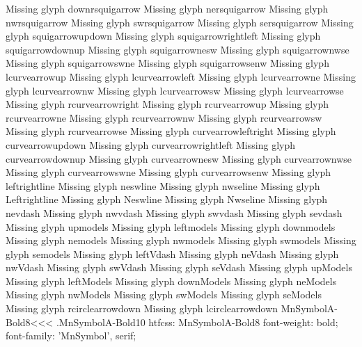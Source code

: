 Missing glyph	downrsquigarrow
Missing glyph	nersquigarrow
Missing glyph	nwrsquigarrow
Missing glyph	swrsquigarrow
Missing glyph	sersquigarrow
Missing glyph	squigarrowupdown
Missing glyph	squigarrowrightleft
Missing glyph	squigarrowdownup
Missing glyph	squigarrownesw
Missing glyph	squigarrownwse
Missing glyph	squigarrowswne
Missing glyph	squigarrowsenw
Missing glyph	lcurvearrowup
Missing glyph	lcurvearrowleft
Missing glyph	lcurvearrowne
Missing glyph	lcurvearrownw
Missing glyph	lcurvearrowsw
Missing glyph	lcurvearrowse
Missing glyph	rcurvearrowright
Missing glyph	rcurvearrowup
Missing glyph	rcurvearrowne
Missing glyph	rcurvearrownw
Missing glyph	rcurvearrowsw
Missing glyph	rcurvearrowse
Missing glyph	curvearrowleftright
Missing glyph	curvearrowupdown
Missing glyph	curvearrowrightleft
Missing glyph	curvearrowdownup
Missing glyph	curvearrownesw
Missing glyph	curvearrownwse
Missing glyph	curvearrowswne
Missing glyph	curvearrowsenw
Missing glyph	leftrightline
Missing glyph	neswline
Missing glyph	nwseline
Missing glyph	Leftrightline
Missing glyph	Neswline
Missing glyph	Nwseline
Missing glyph	nevdash
Missing glyph	nwvdash
Missing glyph	swvdash
Missing glyph	sevdash
Missing glyph	upmodels
Missing glyph	leftmodels
Missing glyph	downmodels
Missing glyph	nemodels
Missing glyph	nwmodels
Missing glyph	swmodels
Missing glyph	semodels
Missing glyph	leftVdash
Missing glyph	neVdash
Missing glyph	nwVdash
Missing glyph	swVdash
Missing glyph	seVdash
Missing glyph	upModels
Missing glyph	leftModels
Missing glyph	downModels
Missing glyph	neModels
Missing glyph	nwModels
Missing glyph	swModels
Missing glyph	seModels
Missing glyph	rcirclearrowdown
Missing glyph	lcirclearrowdown
\<MnSymbolA-Bold8\><<<
.MnSymbolA-Bold10
htfcss:  MnSymbolA-Bold8  font-weight: bold; font-family: 'MnSymbol', serif;

